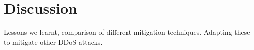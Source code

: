 \section{Discussion}
\label{sec:discussion}

Lessons we learnt, comparison of different mitigation techniques. 
Adapting these to mitigate other DDoS attacks.


